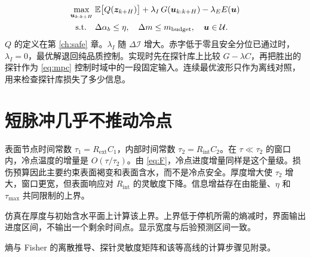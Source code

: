 \begin{equation}
\label{eq:dual}
\begin{aligned}
\max_{\bm{u}_{k:k+H}}\;
& \mathbb{E}\big[Q(\bm{z}_{k+H})\big]
+\lambda_I\, G(\bm{u}_{k:k+H})
-\lambda_E E(\bm{u})\\
\mathrm{s.t.}\quad
& \Delta\alpha_b\le\eta,\quad
\Delta m\le m_{\mathrm{budget}},\quad
\bm{u}\in\mathcal{U}.
\end{aligned}
\end{equation}
$Q$ 的定义在第 \ref{ch:safe} 章。$\lambda_I$ 随 $\Delta\mathcal{I}$ 增大。赤字低于零且安全分位已通过时，$\lambda_I=0$，最优解退回纯品质控制。实现时先在探针库上比较 $G-\lambda C$，再把胜出的探针作为 \eqref{eq:mpc} 控制时域中的一段固定输入。连续最优波形只作为离线对照，用来检查探针库损失了多少信息。

\section{短脉冲几乎不推动冷点}

表面节点时间常数 $\tau_1=R_{\mathrm{ext}}C_1$，内部时间常数 $\tau_2=R_{\mathrm{int}}C_2$。在 $\tau\ll\tau_2$ 的窗口内，冷点温度的增量是 $O(\tau/\tau_2)$。由 \eqref{eq:F}，冷点进度增量同样是这个量级。损伤预算因此主要约束表面褐变和表面含水，而不是冷点安全。厚度增大使 $\tau_2$ 增大，窗口更宽，但表面响应对 $R_{\mathrm{int}}$ 的灵敏度下降。信息增益存在由能量、$\eta$ 和 $\tau_{\max}$ 共同限制的上界。

仿真在厚度与初始含水平面上计算该上界。上界低于停机所需的熵减时，界面输出进度区间，不输出一个剩余时间点。显示宽度与后验预测区间一致。

熵与 Fisher 的离散推导、探针灵敏度矩阵和该等高线的计算步骤见附录。
